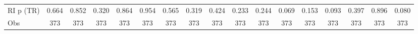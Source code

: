 {\begin{tabular}{l*{16}{c}}
RI p (TR)           &       0.664         &       0.852         &       0.320         &       0.864         &       0.954         &       0.565         &       0.319         &       0.424         &       0.233         &       0.244         &       0.069         &       0.153         &       0.093         &       0.397         &       0.896         &       0.080         \\
Obs                 &         373         &         373         &         373         &         373         &         373         &         373         &         373         &         373         &         373         &         373         &         373         &         373         &         373         &         373         &         373         &         373         \\
\bottomrule
\end{tabular}
}
